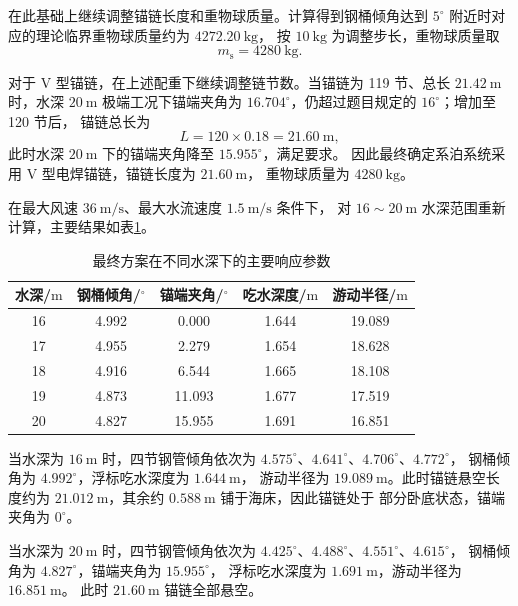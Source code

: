 在此基础上继续调整锚链长度和重物球质量。计算得到钢桶倾角达到
\(5^\circ\) 附近时对应的理论临界重物球质量约为 \(4272.20~\mathrm{kg}\)，
按 \(10~\mathrm{kg}\) 为调整步长，重物球质量取
\begin{equation}
  m_{\mathrm s}=4280~\mathrm{kg}.
  \label{eq:q3-final-ball-mass}
\end{equation}

对于 V 型锚链，在上述配重下继续调整链节数。当锚链为 119 节、总长
\(21.42~\mathrm m\) 时，水深 \(20~\mathrm m\) 极端工况下锚端夹角为
\(16.704^\circ\)，仍超过题目规定的 \(16^\circ\)；增加至 120 节后，
锚链总长为
\begin{equation}
  L=120\times0.18=21.60~\mathrm m,
  \label{eq:q3-final-chain-length}
\end{equation}
此时水深 \(20~\mathrm m\) 下的锚端夹角降至 \(15.955^\circ\)，满足要求。
因此最终确定系泊系统采用 V 型电焊锚链，锚链长度为 \(21.60~\mathrm m\)，
重物球质量为 \(4280~\mathrm{kg}\)。

在最大风速 \(36~\mathrm{m/s}\)、最大水流速度 \(1.5~\mathrm{m/s}\) 条件下，
对 \(16\sim20~\mathrm m\) 水深范围重新计算，主要结果如表\ref{tab:q3-final-depth-results}。

\begin{table}[H]
  \centering
  \caption{最终方案在不同水深下的主要响应参数}
  \label{tab:q3-final-depth-results}
  \begin{tabular}{ccccc}
    \toprule
    水深/\(\mathrm m\) & 钢桶倾角/\(^\circ\) & 锚端夹角/\(^\circ\) & 吃水深度/\(\mathrm m\) & 游动半径/\(\mathrm m\) \\
    \midrule
    16 & 4.992 & 0.000 & 1.644 & 19.089 \\
    17 & 4.955 & 2.279 & 1.654 & 18.628 \\
    18 & 4.916 & 6.544 & 1.665 & 18.108 \\
    19 & 4.873 & 11.093 & 1.677 & 17.519 \\
    20 & 4.827 & 15.955 & 1.691 & 16.851 \\
    \bottomrule
  \end{tabular}
\end{table}

当水深为 \(16~\mathrm m\) 时，四节钢管倾角依次为
\(4.575^\circ\)、\(4.641^\circ\)、\(4.706^\circ\)、\(4.772^\circ\)，
钢桶倾角为 \(4.992^\circ\)，浮标吃水深度为 \(1.644~\mathrm m\)，
游动半径为 \(19.089~\mathrm m\)。此时锚链悬空长度约为
\(21.012~\mathrm m\)，其余约 \(0.588~\mathrm m\) 铺于海床，因此锚链处于
部分卧底状态，锚端夹角为 \(0^\circ\)。

当水深为 \(20~\mathrm m\) 时，四节钢管倾角依次为
\(4.425^\circ\)、\(4.488^\circ\)、\(4.551^\circ\)、\(4.615^\circ\)，
钢桶倾角为 \(4.827^\circ\)，锚端夹角为 \(15.955^\circ\)，
浮标吃水深度为 \(1.691~\mathrm m\)，游动半径为 \(16.851~\mathrm m\)。
此时 \(21.60~\mathrm m\) 锚链全部悬空。

